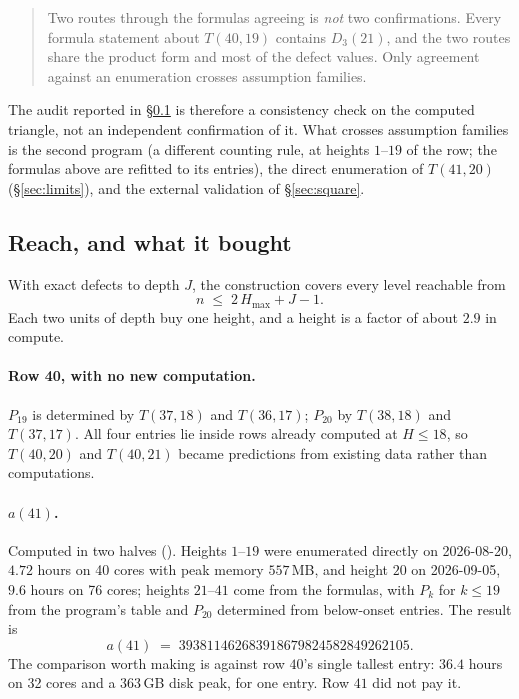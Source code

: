 \documentclass[11pt]{article}
\begin{document}
\begin{quote}
Two routes through the formulas agreeing is \emph{not} two confirmations.
Every formula statement about $T(40,19)$ contains $D_3(21)$, and the two
routes share the product form and most of the defect values. Only agreement
against an enumeration crosses assumption families.
\end{quote}

The audit reported in \S\ref{sec:reach} is therefore a consistency check on
the computed triangle, not an independent confirmation of it. What crosses
assumption families is the second program (a different counting rule, at
heights $1$--$19$ of the row; the formulas above are refitted to its entries),
the direct enumeration of $T(41,20)$ (\S\ref{sec:limits}), and the external
validation of \S\ref{sec:square}.


\subsection{Reach, and what it bought}
\label{sec:reach}

With exact defects to depth $J$, the construction covers every level
reachable from
\[
  n \;\le\; 2\,H_{\max} + J - 1 .
\]
Each two units of depth buy one height, and a height is a factor of about $2.9$
in compute.

\paragraph{Row 40, with no new computation.} $P_{19}$ is determined by
$T(37,18)$ and $T(36,17)$; $P_{20}$ by $T(38,18)$ and $T(37,17)$. All four
entries lie inside rows already computed at $H \le 18$, so $T(40,20)$ and
$T(40,21)$ became predictions from existing data rather than computations.

\paragraph{$a(41)$.} Computed in two halves ().
Heights $1$--$19$ were enumerated directly on 2026-08-20, $4.72$ hours on 40
cores with peak memory $557$\,MB, and height $20$ on 2026-09-05, $9.6$ hours on
76 cores; heights $21$--$41$ come from the formulas, with $P_k$ for $k \le 19$
from the program's table and $P_{20}$ determined from below-onset entries. The
result is
\[
  a(41) \;=\; 393811462683918679824582849262105 .
\]
The comparison worth making is against row $40$'s single tallest entry:
$36.4$ hours on 32 cores and a $363$\,GB disk peak, for one entry. Row $41$
did not pay it.
\end{document}
